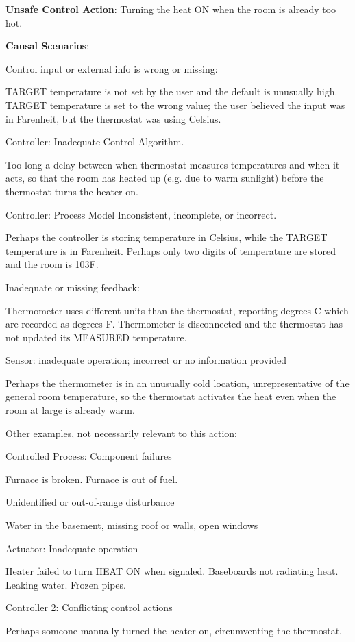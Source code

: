 
\textbf{Unsafe Control Action}: Turning the heat ON when the room is already too hot.

\textbf{Causal Scenarios}:

\begin{compactitem}
\item Control input or external info is wrong or missing:
  
  TARGET temperature is not set by the user and the default is unusually high.
  TARGET temperature is set to the wrong value; the user believed the input was in Farenheit, but the thermostat was using Celsius.  

\item Controller: Inadequate Control Algorithm.
  
Too long a delay between when thermostat measures temperatures and when it acts, so that the room has heated up (e.g. due to warm sunlight) before the thermostat turns the heater on.  
\item Controller: Process Model Inconsistent, incomplete, or incorrect.

  Perhaps the controller is storing temperature in Celsius, while the TARGET temperature is in Farenheit.
  Perhaps only two digits of temperature are stored and the room is 103F.
\item Inadequate or missing feedback:

  Thermometer uses different units than the thermostat, reporting degrees C which are recorded as degrees F.
  Thermometer is disconnected and the thermostat has not updated its MEASURED temperature.
%
 \item Sensor: inadequate operation; incorrect or no information provided

   Perhaps the thermometer is in an unusually cold location, unrepresentative of the general room temperature, so the thermostat activates the heat even when the room at large is already warm.
\end{compactitem}

\columnbreak
Other examples, not necessarily relevant to this action:

\begin{compactitem}
\item Controlled Process: Component failures
   
Furnace is broken. Furnace is out of fuel.
   \item Unidentified or out-of-range disturbance
   
Water in the basement, missing roof or walls, open windows
\item Actuator: Inadequate operation

  Heater failed to turn HEAT ON when signaled. Baseboards not radiating heat. Leaking water. Frozen pipes.

\item Controller 2: Conflicting control actions

Perhaps someone manually turned the heater on, circumventing the thermostat.
\end{compactitem}
